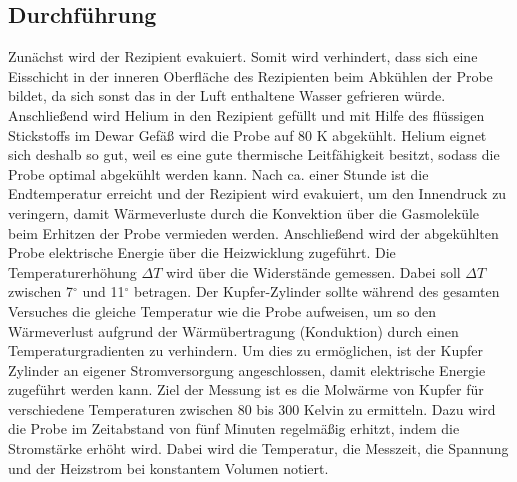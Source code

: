 \documentclass{article}
\begin{document}
\subsection{Durchführung}
Zunächst wird der Rezipient evakuiert. Somit wird verhindert, dass sich eine Eisschicht in der inneren Oberfläche des Rezipienten beim Abkühlen der Probe bildet, da sich sonst das in der Luft enthaltene Wasser gefrieren würde.  Anschließend wird Helium in den Rezipient gefüllt und mit Hilfe des flüssigen Stickstoffs im Dewar Gefäß wird die Probe auf 80 K abgekühlt. Helium eignet sich deshalb so gut, weil es eine gute thermische Leitfähigkeit besitzt, sodass die Probe optimal abgekühlt werden kann. Nach ca. einer Stunde ist die Endtemperatur erreicht und der Rezipient wird evakuiert, um den Innendruck zu veringern, damit Wärmeverluste durch die Konvektion über die Gasmoleküle beim Erhitzen der Probe vermieden werden. Anschließend wird der abgekühlten Probe elektrische Energie über die Heizwicklung zugeführt. Die Temperaturerhöhung $\Delta T$ wird über die Widerstände gemessen. Dabei soll $\Delta T$ zwischen 7$^{\circ}$ und 11$^{\circ}$ betragen. Der Kupfer-Zylinder sollte während des gesamten Versuches die gleiche Temperatur wie die Probe aufweisen, um so den Wärmeverlust aufgrund der Wärmübertragung (Konduktion) durch einen Temperaturgradienten zu verhindern. Um dies zu ermöglichen, ist der Kupfer Zylinder an eigener Stromversorgung angeschlossen, damit elektrische Energie zugeführt werden kann. Ziel der Messung ist es die Molwärme von Kupfer für verschiedene Temperaturen zwischen 80 bis 300 Kelvin zu ermitteln. Dazu wird die Probe im Zeitabstand von fünf Minuten regelmäßig  erhitzt, indem die Stromstärke erhöht wird. Dabei wird die Temperatur, die Messzeit, die Spannung und der Heizstrom bei konstantem Volumen notiert.  
\end{document}
